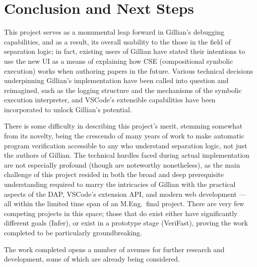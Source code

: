 
\chapter{Conclusion and Next Steps}\label{sec:conclusion}

This project serves as a monumental leap forward in Gillian's debugging
capabilities, and as a result, its overall usability to the those in the field
of separation logic; in fact, existing users of Gillian have stated their
intentions to use the new UI as a means of explaining how CSE (compositional
symbolic execution) works when authoring papers in the future. Various technical
decisions underpinning Gillian's implementation have been called into question
and reimagined, such as the logging structure and the mechanisms of the symbolic
execution interpreter, and VSCode's extensible capabilities have been
incorporated to unlock Gillian's potential.

There is some difficulty in describing this project's merit, stemming somewhat
from its novelty, being the crescendo of many years of work to make automatic
program verification accessible to any who understand separation logic, not just
the authors of Gillian. The technical hurdles faced during actual implementation
are not especially profound (though are noteworthy nonetheless), as the main
challenge of this project resided in both the broad and deep prerequisite
understanding required to marry the intricacies of Gillian with the practical
aspects of the DAP, VSCode's extension API, and modern web development --- all
within the limited time span of an M.Eng.\ final project. There are very few
competing projects in this space; those that do exist either have significantly
different goals (Infer), or exist in a prototype stage (VeriFast), proving the
work completed to be particularly groundbreaking.

The work completed opens a number of avenues for further research and
development, some of which are already being considered.



